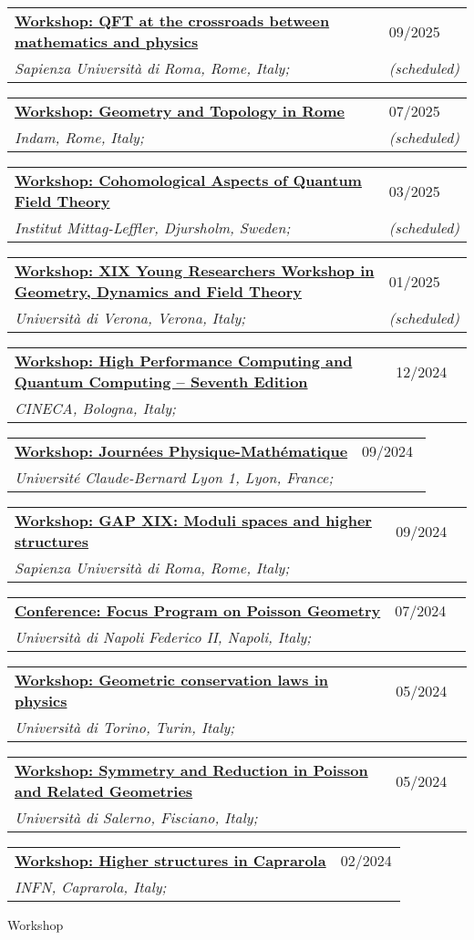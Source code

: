 \documentclass[a4paper]{article}
\newcommand{\longvoice}[8]{
	\begin{tabular}{p{0.83\linewidth} p{0.17\linewidth} }
		\textbf{\href{#3}{#2: #1}} & #4 
		\\ 
		\textit{#5, #6, #7;} & {\small\emph{#8}}
	\end{tabular}
	\vspace{.5em}
}
\begin{document}
    \longvoice{QFT at the crossroads between mathematics and physics}
        {Workshop}
        {https://sites.google.com/view/qft-at-the-crossroads/home?authuser=0}
        {09/2025}
        {Sapienza Università di Roma}
        {Rome}
        {Italy}
        {(scheduled)}
    \longvoice{Geometry and Topology in Rome}
        {Workshop}
        {https://www.mat.uniroma2.it/~kowalzig/ws.html}
        {07/2025}
        {Indam}
        {Rome}
        {Italy}
        {(scheduled)}	
	\longvoice{Cohomological Aspects of Quantum Field Theory}
		{Workshop}
		{https://www.mittag-leffler.se/activities/cohomological-aspects-of-quantum-field-theory/}
		{03/2025}
		{Institut Mittag-Leffler}
		{Djursholm}
		{Sweden}
		{(scheduled)}
	\longvoice{XIX Young Researchers Workshop in Geometry, Dynamics and Field Theory}
		{Workshop}
		{https://sites.google.com/view/xix-yrw-verona/program?authuser=0}
		{01/2025}
		{Università di Verona}
		{Verona}
		{Italy}
		{(scheduled)}
	\longvoice{High Performance Computing and Quantum Computing – Seventh Edition}
		{Workshop}
		{https://eventi.cineca.it/en/hpc/high-performance-computing-and-quantum-computing-seventh-edition/bologna-20241212}
		{12/2024}
		{CINECA}
		{Bologna}
		{Italy}
		{}
	\longvoice{Journées Physique-Mathématique}
		{Workshop}
		{https://indico.math.cnrs.fr/event/12743/overview}
		{09/2024}
		{Université Claude-Bernard Lyon 1}
		{Lyon}
		{France}
		{}
	\longvoice{GAP XIX: Moduli spaces and higher structures}
		{Workshop}
		{https://www1.mat.uniroma1.it/~fiorenza/GAP-Rome/GAP-XIX-2024-Rome.html}
		{09/2024}
		{Sapienza Università di Roma}
		{Rome}
		{Italy}
		{}
	\longvoice{Focus Program on Poisson Geometry}
		{Conference}
		{https://sites.google.com/view/poisson2024/poisson-2024?authuser=0}
		{07/2024}
		{Università di Napoli Federico II}
		{Napoli}
		{Italy}
		{}
	\longvoice{Geometric conservation laws in physics}
		{Workshop}
		{https://www.dropbox.com/scl/fi/j54tl4m10fl2scbrtc4sx/2405-Torino-Conservationlaws.pdf?rlkey=ay7nrxda4fg8lklvox578g6yj\&st=9t3jx47r\&dl=0}
		{05/2024}
		{Università di Torino}
		{Turin}
		{Italy}
		{}
	\longvoice{Symmetry and Reduction in Poisson and Related Geometries}
		{Workshop}
		{https://sites.google.com/view/poisson2024/seminars-workshops/symmetry-reduction?authuser=0}
		{05/2024}
		{Università di Salerno}
		{Fisciano}
		{Italy}
		{}
	\longvoice{Higher structures in Caprarola}
		{Workshop}
		{http://wpage.unina.it/francesco.dandrea/Caprarola2024/index.html}
		{02/2024}
		{INFN}
		{Caprarola}
		{Italy}
		{}
		{Workshop}
\end{document}
